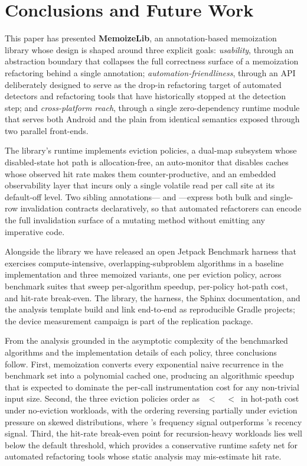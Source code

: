\section{Conclusions and Future Work}\label{sec:conclusions}

This paper has presented \textbf{MemoizeLib}, an annotation-based memoization library whose design is shaped around three explicit goals: \emph{usability}, through an abstraction boundary that collapses the full correctness surface of a memoization refactoring behind a single annotation; \emph{automation-friendliness}, through an API deliberately designed to serve as the drop-in refactoring target of automated detectors and refactoring tools that have historically stopped at the detection step; and \emph{cross-platform reach}, through a single zero-dependency runtime module that serves both Android and the plain \jvm from identical semantics exposed through two parallel front-ends.

The library's runtime implements \numPolicies eviction policies, a dual-map \ttl subsystem whose disabled-state hot path is allocation-free, an auto-monitor that disables caches whose observed hit rate makes them counter-productive, and an embedded observability layer that incurs only a single volatile read per call site at its default-off level. Two sibling annotations--- and ---express both bulk and single-row invalidation contracts declaratively, so that automated refactorers can encode the full invalidation surface of a mutating method without emitting any imperative code.

Alongside the library we have released an open Jetpack Benchmark harness that exercises \numAlgorithms compute-intensive, overlapping-subproblem algorithms in a baseline implementation and three memoized variants, one per eviction policy, across \numBenchmarkSuites benchmark suites that sweep per-algorithm speedup, per-policy hot-path cost, and hit-rate break-even. The library, the harness, the Sphinx documentation, and the analysis template build and link end-to-end as reproducible Gradle projects; the device measurement campaign is part of the replication package.

From the analysis grounded in the asymptotic complexity of the benchmarked algorithms and the implementation details of each policy, three conclusions follow. First, memoization converts every exponential naive recurrence in the benchmark set into a polynomial cached one, producing an algorithmic speedup that is expected to dominate the per-call instrumentation cost for any non-trivial input size. Second, the three eviction policies order as \fifo~$<$~\lru~$<$~\lfu in hot-path cost under no-eviction workloads, with the ordering reversing partially under eviction pressure on skewed distributions, where \lfu's frequency signal outperforms \lru's recency signal. Third, the hit-rate break-even point for recursion-heavy workloads lies well below the default  threshold, which provides a conservative runtime safety net for automated refactoring tools whose static analysis may mis-estimate hit rate.

